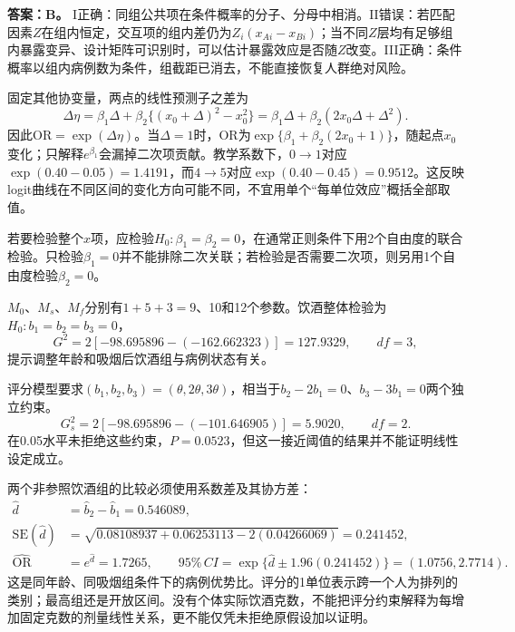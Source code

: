 \textbf{答案：B。} I正确：同组公共项在条件概率的分子、分母中相消。II错误：若匹配因素$Z$在组内恒定，交互项的组内差仍为$Z_i(x_{Ai}-x_{Bi})$；当不同$Z$层均有足够组内暴露变异、设计矩阵可识别时，可以估计暴露效应是否随$Z$改变。III正确：条件概率以组内病例数为条件，组截距已消去，不能直接恢复人群绝对风险。
\par\nobreak\smallskip{}

固定其他协变量，两点的线性预测子之差为\[\Delta\eta=\beta_1\Delta+\beta_2\{(x_0+\Delta)^2-x_0^2\}=\beta_1\Delta+\beta_2(2x_0\Delta+\Delta^2).\]因此$\mathrm{OR}=\exp(\Delta\eta)$。当$\Delta=1$时，OR为$\exp\{\beta_1+\beta_2(2x_0+1)\}$，随起点$x_0$变化；只解释$e^{\beta_1}$会漏掉二次项贡献。教学系数下，$0\to1$对应$\exp(0.40-0.05)=1.4191$，而$4\to5$对应$\exp(0.40-0.45)=0.9512$。这反映logit曲线在不同区间的变化方向可能不同，不宜用单个“每单位效应”概括全部取值。\par 若要检验整个$x$项，应检验$H_0:\beta_1=\beta_2=0$，在通常正则条件下用2个自由度的联合检验。只检验$\beta_1=0$并不能排除二次关联；若检验是否需要二次项，则另用1个自由度检验$\beta_2=0$。
\par\nobreak\smallskip{}

$M_0$、$M_s$、$M_f$分别有$1+5+3=9$、10和12个参数。饮酒整体检验为$H_0:b_1=b_2=b_3=0$，\[G^2=2[-98.695896-(-162.662323)]=127.9329,\qquad df=3,\]提示调整年龄和吸烟后饮酒组与病例状态有关。\par 评分模型要求$(b_1,b_2,b_3)=(\theta,2\theta,3\theta)$，相当于$b_2-2b_1=0$、$b_3-3b_1=0$两个独立约束。\[G_s^2=2[-98.695896-(-101.646905)]=5.9020,\qquad df=2.\]在0.05水平未拒绝这些约束，$P=0.0523$，但这一接近阈值的结果并不能证明线性设定成立。\par 两个非参照饮酒组的比较必须使用系数差及其协方差：\[\begin{aligned}\hat d&=\hat b_2-\hat b_1=0.546089,\\\mathrm{SE}(\hat d)&=\sqrt{0.08108937+0.06253113-2(0.04266069)}=0.241452,\\\widehat{\mathrm{OR}}&=e^{\hat d}=1.7265,\qquad95\%\,CI=\exp\{\hat d\pm1.96(0.241452)\}=(1.0756,2.7714).\end{aligned}\]这是同年龄、同吸烟组条件下的病例优势比。评分的1单位表示跨一个人为排列的类别；最高组还是开放区间。没有个体实际饮酒克数，不能把评分约束解释为每增加固定克数的剂量线性关系，更不能仅凭未拒绝原假设加以证明。
\par\nobreak\smallskip{}

